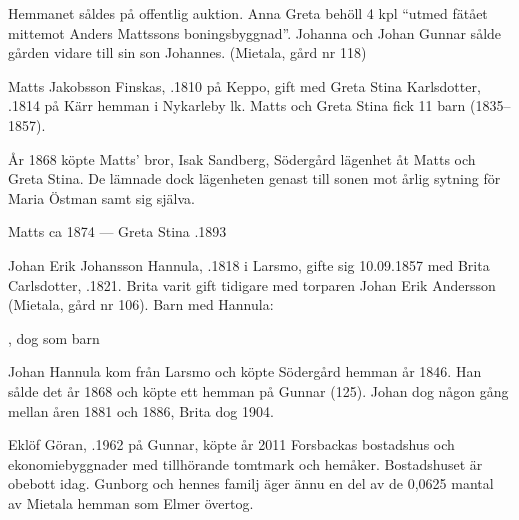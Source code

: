 Hemmanet såldes på offentlig auktion. Anna Greta behöll 4 kpl ``utmed fätået mittemot Anders Mattssons boningsbyggnad''. Johanna och Johan Gunnar sålde gården vidare till sin son Johannes. (Mietala, gård nr 118)


%
Matts Jakobsson Finskas, .1810 på Keppo, gift med Greta Stina Karlsdotter,  .1814 på Kärr hemman i Nykarleby lk. Matts och Greta Stina fick 11 barn (1835--1857).

År 1868 köpte Matts' bror, Isak Sandberg, Södergård lägenhet åt Matts och Greta Stina. De lämnade dock lägenheten genast till sonen  mot årlig sytning för Maria Östman samt sig själva.

Matts \textdied ca 1874  ---  Greta Stina .1893


%
Johan Erik Johansson Hannula, .1818 i Larsmo, gifte sig 10.09.1857 med Brita Carlsdotter, .1821. Brita varit gift tidigare med torparen Johan Erik Andersson (Mietala, gård nr 106). Barn med Hannula:
\begin{jhchildren}
  \item {}
  \item {}
  \item {}, dog som barn
  \item {}
\end{jhchildren}

Johan Hannula kom från Larsmo och köpte Södergård hemman år 1846. Han sålde det år 1868 och köpte ett hemman på Gunnar (125). Johan dog någon gång mellan åren 1881 och 1886, Brita dog 1904.



%



%
Eklöf Göran, .1962 på Gunnar, köpte år 2011 Forsbackas bostadshus och ekonomiebyggnader med tillhörande tomtmark och hemåker. Bostadshuset är obebott idag. Gunborg och hennes familj äger ännu en del av de 0,0625 mantal av Mietala hemman som Elmer övertog.


